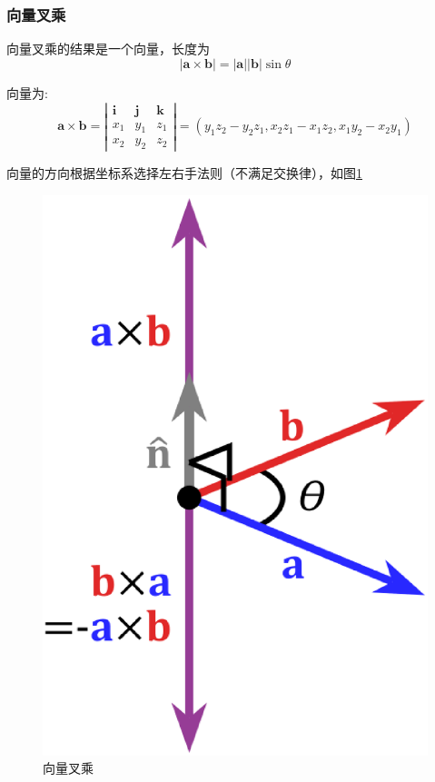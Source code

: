 \documentclass[a4paper,oneside,11pt]{article}
\newcommand{\bol}[1]{\textbf{#1}}
\begin{document}
\subsubsection{向量叉乘}
向量叉乘的结果是一个向量，长度为
\begin{displaymath}
\vert\bol{a}\times\bol{b}\vert = \vert\bol{a}\vert \vert\bol{b}\vert \sin\theta
\end{displaymath}
\par 向量为:
\begin{displaymath}
\bol{a}\times\bol{b} = \left\vert
\begin{array}{ccc}
\bol{i} & \bol{j} & \bol{k}\\
x_1 & y_1 & z_1\\
x_2 & y_2 & z_2
\end{array}
\right\vert = \left(y_1z_2 - y_2z_1 , x_2z_1 - x_1z_2 , x_1y_2  - x_2y_1\right)
\end{displaymath}
\par 向量的方向根据坐标系选择左右手法则（不满足交换律），如图\ref{fig2}
\begin{figure}[!h]
\centering
\includegraphics[scale=0.3]{./figure/fig2.eps}
\caption{\label{fig2}向量叉乘}
\end{figure}
\newpage
\end{document}
